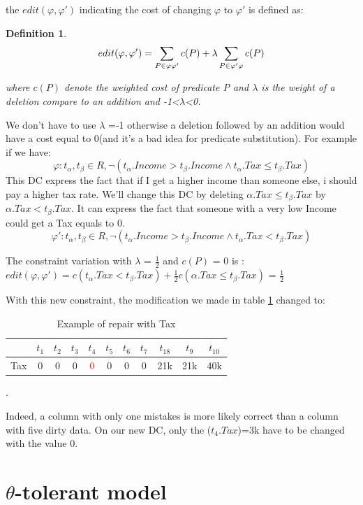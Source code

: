 \documentclass[letterpaper, 12pt]{report}
\newtheorem{mydef}{Definition}
\begin{document}
the $edit(\varphi , \varphi ')$ indicating the cost of changing $\varphi$ to $\varphi'$ is defined as:
\begin{mydef}
$$
 edit(\varphi, \varphi') = \sum_{P \in \varphi \\ \varphi'} c(P) + \lambda \sum_{P \in \varphi' \\ \varphi} c(P)$$
 
where $c(P)$ denote the weighted cost of predicate P and $\lambda$ is the weight of a deletion compare to an addition and -1<$\lambda$<0.
\end{mydef}

We don't have to use $\lambda$ =-1 otherwise a deletion followed by an addition would have a cost equal to 0(and it's a bad idea for predicate substitution). For example if we have:
$$ \varphi : t_\alpha,t_\beta \in R, \neg(t_\alpha.Income > t_\beta.Income \wedge t_\alpha.Tax \leq t_\beta.Tax)$$
This DC express the fact that if I get a higher income than someone else, i should pay a higher tax rate. We'll change this DC by deleting $\alpha.Tax \leq t_\beta.Tax$ by $\alpha.Tax < t_\beta.Tax$. It can express the fact that someone with a very low Income could get a Tax equals to 0.
$$ \varphi ' : t_\alpha,t_\beta \in R, \neg(t_\alpha.Income > t_\beta.Income \wedge t_\alpha.Tax < t_\beta.Tax)$$

The constraint variation with $\lambda$ = $\frac{1}{2}$ and $c(P)$ = 0 is : $edit(\varphi, \varphi') = c(t_\alpha.Tax < t_\beta.Tax) + \frac{1}{2} c(\alpha.Tax \leq t_\beta.Tax)$ = $\frac{1}{2}$

With this new constraint, the modification we made in table \ref{tableExample} changed to:

\begin{table}[H]
	\centering
	\begin{tabular}{|c|c c c c c c c c c c|}
	\hline
	   & $t_1$ & $t_2$ & $t_3$ &$t_4$ &$t_5$ &$t_6$ &$t_7$ &$t_18$ &$t_9$ &$t_10$ \\
	\hline
	 Tax & 0 & 0 & 0 & \textcolor{red}{0} & 0 & 0 & 0 & 21k & 21k & 40k\\
	 \hline
	\end{tabular}
	\caption{\label{tableExample} Example of repair with Tax}.
\end{table}

Indeed, a column with only one mistakes is more likely correct than a column with five dirty data. On our new DC, only the ($t_4.Tax$)=3k have to be changed with the value 0.
\section{$\theta$-tolerant model}
\end{document}
